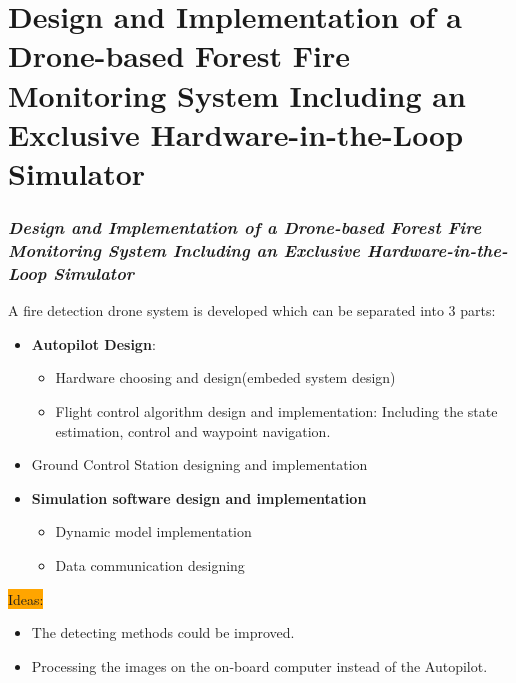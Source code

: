 \section{Design and Implementation of a Drone-based Forest Fire Monitoring
System Including an Exclusive Hardware-in-the-Loop Simulator}
\begin{frame}
    \frametitle{\textit{Design and Implementation of a Drone-based Forest Fire Monitoring System Including an Exclusive
    Hardware-in-the-Loop Simulator}}

    A fire detection drone system is developed which can be separated into 3
    parts:
    \begin{itemize}
        \item \textbf{Autopilot Design}: 
            \begin{itemize}
                \item Hardware choosing and design(embeded system design)
                \item Flight control algorithm design and implementation:
                    \linebreak
                    Including the state estimation, control and waypoint
                    navigation.
            \end{itemize}
        \item Ground Control Station designing and implementation
        \item \textbf{Simulation software design and implementation}
            \begin{itemize}
                \item Dynamic model implementation
                \item Data communication designing
            \end{itemize}
    \end{itemize}

    \colorbox{orange}{Ideas:}
    \begin{itemize}
        \item The detecting methods could be improved.
        \item Processing the images on the on-board computer instead of the
            Autopilot.
    \end{itemize}

\end{frame}
